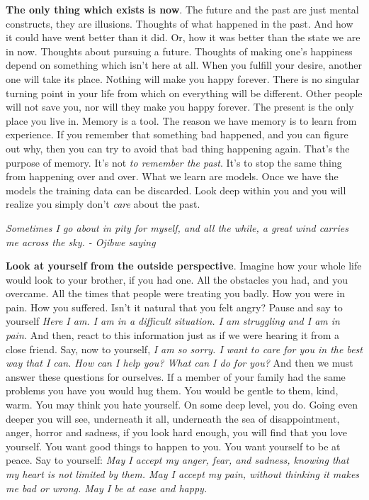 \documentclass[a4paper,hidelinks]{article}
\begin{document}
\textbf{The only thing which exists is now}.
The future and the past are just mental constructs, they are illusions.
Thoughts of what happened in the past.
And how it could have went better than it did.
Or, how it was better than the state we are in now.
Thoughts about pursuing a future.
Thoughts of making one's happiness depend on something which isn't here at all.
When you fulfill your desire, another one will take its place.
Nothing will make you happy forever.
There is no singular turning point in your life from which on everything will be different.
Other people will not save you, nor will they make you happy forever.
The present is the only place you live in.
Memory is a tool.
The reason we have memory is to learn from experience.
If you remember that something bad happened, and you can figure out why, then you can try to avoid that bad thing happening again.
That’s the purpose of memory.
It’s not \textit{to remember the past}.
It’s to stop the same thing from happening over and over.
What we learn are models.
Once we have the models the training data can be discarded.
Look deep within you and you will realize you simply don't \textit{care} about the past.

\newpage

\begin{center}
\textit{
Sometimes I go about in pity for myself, and all the while, a great wind carries me across the sky. - Ojibwe saying
}
\end{center}

\textbf{Look at yourself from the outside perspective}.
Imagine how your whole life would look to your brother, if you had one.
All the obstacles you had, and you overcame.
All the times that people were treating you badly.
How you were in pain.
How you suffered.
Isn't it natural that you felt angry?
Pause and say to yourself
\textit{
Here I am.
I am in a difficult situation.
I am struggling and I am in pain.
}
And then, react to this information just as if we were hearing it from a close friend.
Say, now to yourself,
\textit{
I am so sorry.
I want to care for you in the best way that I can.
How can I help you? What can I do for you?
}
And then we must answer these questions for ourselves.
If a member of your family had the same problems you have you would hug them.
You would be gentle to them, kind, warm.
You may think you hate yourself.
On some deep level, you do.
Going even deeper you will see, underneath it all, underneath the sea of disappointment, anger, horror and sadness, if you look hard enough, you will find that you love yourself.
You want good things to happen to you.
You want yourself to be at peace.
Say to yourself:
\textit{
May I accept my anger, fear, and sadness, knowing that my heart is not limited by them.
May I accept my pain, without thinking it makes me bad or wrong.
May I be at ease and happy.
}
\end{document}
